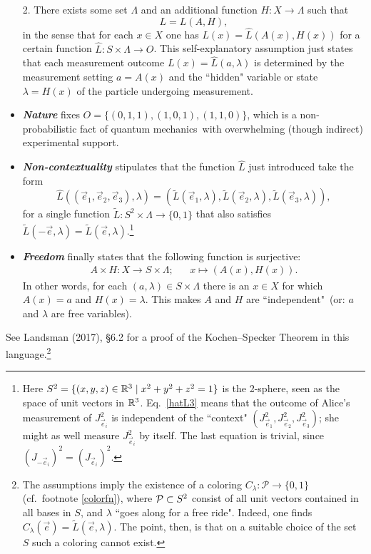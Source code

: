 \documentclass[12pt]{article}
\numberwithin{equation}{section}
\newcommand{\hi}[1]{\emph{\textbf{#1}}}
\newcommand{\qm}{quantum mechanics}
\newcommand{\er}{\eqref}
\newcommand{\beq}{\begin{equation}}
\newcommand{\eeq}{\end{equation}}
\newcommand{\til}{\tilde}
\newcommand{\raw}{\rightarrow}
\newcommand{\x}{\times}
\newcommand{\lm}{\lambda} \newcommand{\Lm}{\Lambda}
\begin{document}
\begin{itemize}
2. There exists some set $\Lm$ and an additional function 
$H:X\raw \Lm$ such that  
\beq
L=L(A,H),
\eeq
 in the sense that
 for each $x\in X$ one has $L(x)=\hat{L}(A(x),H(x))$
  for a certain function  $\hat{L}:S \x \Lm\raw O$.  This self-explanatory assumption just states that each measurement outcome 
  $L(x)=\hat{L}(a,\lm)$ 
  is determined by the  measurement setting $a=A(x)$ and the ``hidden" variable or state $\lm=H(x)$  of the particle
 undergoing measurement.
  \item  \hi{Nature}  fixes 
 $O=\{(0,1,1), (1,0,1), (1,1,0)\}$, which is a non-probabilistic fact of \qm\ with overwhelming (though  indirect) experimental support. 
   \item \hi{Non-contextuality}
stipulates that the function $\hat{L}$ just introduced take the form
  \beq
  \hat{L}((\vec{e}_1,\vec{e}_2,\vec{e}_3),\lm)=(\til{L}(\vec{e}_1,\lm), \til{L}(\vec{e}_2,\lm), \til{L}(\vec{e}_3,\lm)), \label{hatL3}
  \eeq
  for a single function $\til{L}:S^2\x \Lm\raw\{0,1\}$ that also satisfies 
$\til{L}(-\vec{e},\lm)=\til{L}(\vec{e},\lm)$.\footnote{Here $S^2=\{(x,y,z)\in{\mathbb R}^3\mid x^2+y^2+z^2=1\}$ is the 2-sphere, seen as the space of unit vectors in ${\mathbb R}^3$.
Eq.\ \er{hatL3} means that the outcome of Alice's measurement 
of $J_{\vec{e}_i}^2$ is independent of the ``context" $(J_{\vec{e}_1}^2, J_{\vec{e}_2}^2, J_{\vec{e}_3}^2)$; she might as well measure $J_{\vec{e}_i}^2$ by itself. The last equation is trivial, since $(J_{-\vec{e}_i})^2=(J_{\vec{e}_i})^2$.
}
  \item \hi{Freedom} finally states that the following function is surjective:
\begin{align}
A\x H:X\raw S\x \Lm; && x\mapsto (A(x),H(x)).
\end{align}
 In other words, 
 for each $(a,\lm)\in S\x\Lm$ there is an $x\in X$  for which $A(x)=a$ and $H(x)=\lm$. This makes   $A$ and $H$ are ``independent"\
 (or: $a$ and $\lm$ are free variables).
  \end{itemize}
See Landsman (2017), \S6.2 for a proof of the Kochen--Specker Theorem in this language.\footnote{
The assumptions imply the existence of a coloring $C_{\lm}: \mathcal{P}\raw\{0,1\}$ (cf.\ footnote \ref{colorfn}), where 
${\mathcal P}\subset S^2$ consist of all unit vectors contained in all bases in $S$, and $\lm$ ``goes along for a free ride". Indeed, one finds
$C_{\lm}(\vec{e})=\til{L}(\vec{e},\lm)$. The point, then, is that on a suitable choice of the set $S$ such a coloring cannot exist. 
}
\smallskip
\end{document}

